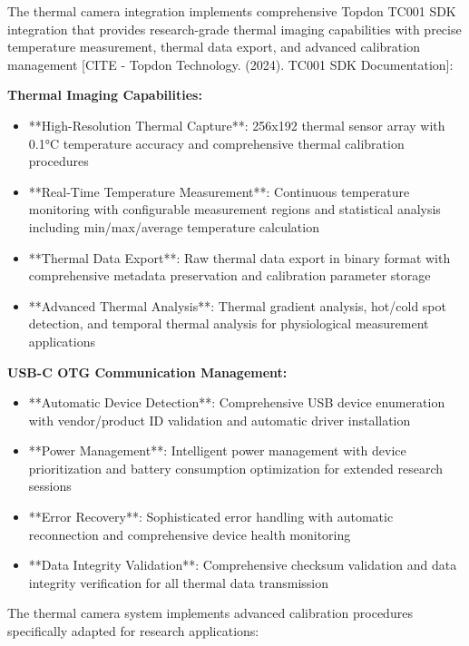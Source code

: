 \documentclass[11pt,a4paper]{report}
\begin{document}
The thermal camera integration implements comprehensive Topdon TC001 SDK integration that provides research-grade
thermal imaging capabilities with precise temperature measurement, thermal data export, and advanced calibration
management [CITE - Topdon Technology. (2024). TC001 SDK Documentation]:

\textbf{Thermal Imaging Capabilities:}

\begin{itemize}
\item **High-Resolution Thermal Capture**: 256x192 thermal sensor array with 0.1°C temperature accuracy and comprehensive
  thermal calibration procedures
\item **Real-Time Temperature Measurement**: Continuous temperature monitoring with configurable measurement regions and
  statistical analysis including min/max/average temperature calculation
\item **Thermal Data Export**: Raw thermal data export in binary format with comprehensive metadata preservation and
  calibration parameter storage
\item **Advanced Thermal Analysis**: Thermal gradient analysis, hot/cold spot detection, and temporal thermal analysis for
  physiological measurement applications

\end{itemize}
\textbf{USB-C OTG Communication Management:}

\begin{itemize}
\item **Automatic Device Detection**: Comprehensive USB device enumeration with vendor/product ID validation and automatic
  driver installation
\item **Power Management**: Intelligent power management with device prioritization and battery consumption optimization for
  extended research sessions
\item **Error Recovery**: Sophisticated error handling with automatic reconnection and comprehensive device health
  monitoring
\item **Data Integrity Validation**: Comprehensive checksum validation and data integrity verification for all thermal data
  transmission

\end{itemize}
The thermal camera system implements advanced calibration procedures specifically adapted for research applications:
\end{document}
